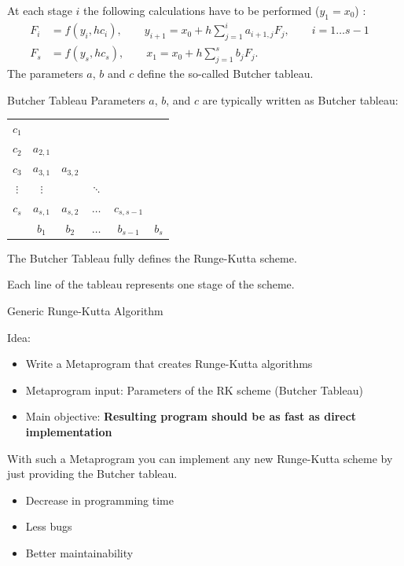 \documentclass{beamer}
\begin{document}
\begin{frame}
 At each stage $i$ the following calculations have to be performed ($y_1 = x_0$) :
\begin{align*} \label{eqn:rk_scheme}
 F_i &= f( y_{i} , h c_i ), \qquad y_{i+1} = x_0 + h\sum_{j=1}^{i} a_{i+1,j} F_j, \qquad i=1\dots s-1\quad 
\\
 F_s &= f(y_{s} , h c_s ) , \qquad x_1 = x_0 + h\sum_{j=1}^{s} b_{j} F_j.
\end{align*}
The parameters $a$, $b$ and $c$ define the so-called Butcher tableau.

\end{frame}


\begin{frame}{Butcher Tableau}
Parameters $a$, $b$, and $c$ are typically written as Butcher tableau:

\begin{center}
 \begin{tabular}{c|ccccc}
   $c_1$ &  & & & & \\
   $c_2$ & $a_{2,1}$ & & & & \\
   $c_3$ & $a_{3,1}$ & $a_{3,2}$ & & & \\
   $\vdots$ & $\vdots$ &  & $\ddots$ & & \\
   $c_s$ & $a_{s,1}$ & $a_{s,2}$ & $\dots$ & $c_{s,s-1}$ & \\
  \hline 
    & $b_1$ & $b_2$ & $\dots$ & $b_{s-1}$ & $b_s$ \\
 \end{tabular}
\end{center}
 
The Butcher Tableau fully defines the Runge-Kutta scheme.

Each line of the tableau represents one stage of the scheme.
\end{frame}

\begin{frame}{Generic Runge-Kutta Algorithm}
 
\begin{Large}Idea:\end{Large}
  \begin{itemize}
    \item Write a Metaprogram that creates Runge-Kutta algorithms
    \item Metaprogram input: Parameters of the RK scheme (Butcher Tableau)
    \item Main objective: \textbf{Resulting program should be as fast as direct implementation}
  \end{itemize}

\vspace{1em}
With such a Metaprogram you can implement any new Runge-Kutta scheme by just providing the Butcher tableau.

\begin{itemize}
 \item Decrease in programming time
 \item Less bugs
 \item Better maintainability
\end{itemize}

\end{frame}
\end{document}
